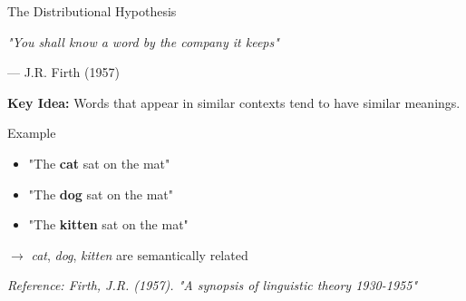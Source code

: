 \documentclass[aspectratio=169]{beamer}
\begin{document}
\begin{frame}{The Distributional Hypothesis 📖}
\begin{center}
\huge
\textit{"You shall know a word by the company it keeps"}
\end{center}

\begin{center}
--- J.R. Firth (1957)
\end{center}

\pause
\vspace{1em}

\textbf{Key Idea:}
Words that appear in similar contexts tend to have similar meanings.

\vspace{1em}

\begin{exampleblock}{Example}
\begin{itemize}\setlength{\itemsep}{0pt}
    \item "The \textbf{cat} sat on the mat"
    \item "The \textbf{dog} sat on the mat"
    \item "The \textbf{kitten} sat on the mat"
\end{itemize}
$\rightarrow$ \textit{cat}, \textit{dog}, \textit{kitten} are semantically related
\end{exampleblock}

\vspace{0.5em}
\small
\textit{Reference: Firth, J.R. (1957). "A synopsis of linguistic theory 1930-1955"}
\end{frame}
\end{document}
